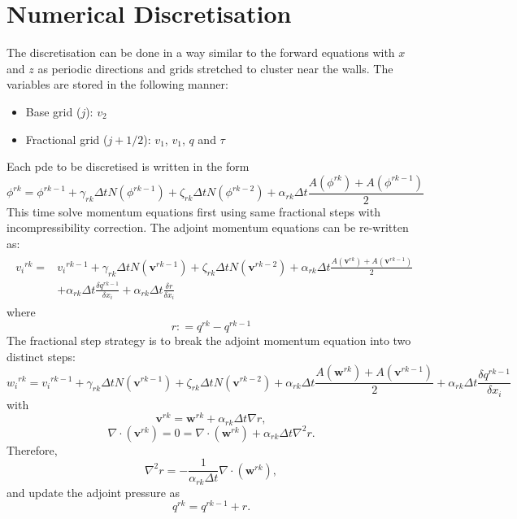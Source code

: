 \documentclass[preprint,12pt]{article}
\begin{document}
\section{Numerical Discretisation}
The discretisation can be done in a way similar to the forward equations with $x$ and $z$ as periodic directions and grids stretched to cluster near the walls. The variables are stored in the following manner:
\begin{itemize}
	\item Base grid ($j$): $v_2$
	\item Fractional grid ($j+1/2$): $v_1$, $v_1$, $q$ and $\tau$ 
\end{itemize}
Each pde to be discretised is written in the form
\begin{equation}
\phi^{rk}=\phi^{rk-1}+\gamma_{rk}\Delta t N(\phi^{rk-1})+\zeta_{rk}\Delta t N(\phi^{rk-2})+\alpha_{rk}\Delta t\frac{A(\phi^{rk})+A(\phi^{rk-1})}{2}
\end{equation}
This time solve momentum equations first using same fractional steps with incompressibility correction.
The adjoint momentum equations can be re-written as:
\begin{align}
\begin{split}
{v_i}^{rk}=&{v_i}^{rk-1}+\gamma_{rk}\Delta t N(\mathbf{v}^{rk-1})+\zeta_{rk}\Delta t N(\mathbf{v}^{rk-2})+\alpha_{rk}\Delta t\frac{A(\mathbf{v}^{rk})+A(\mathbf{v}^{rk-1})}{2}\\&+\alpha_{rk}\Delta t\frac{\delta q^{rk-1}}{\delta x_i}+\alpha_{rk}\Delta t\frac{\delta r}{\delta x_i}
\end{split}
\end{align} 
where 
\begin{equation}
r\mathrel{\mathop:}= q^{rk}-q^{rk-1}
\end{equation}
The fractional step strategy is to break the adjoint momentum equation into two distinct steps:
\begin{equation}
{w_i}^{rk}={v_i}^{rk-1}+\gamma_{rk}\Delta t N(\mathbf{v}^{rk-1})+\zeta_{rk}\Delta t N(\mathbf{v}^{rk-2})+\alpha_{rk}\Delta t\frac{A(\mathbf{w}^{rk})+A(\mathbf{v}^{rk-1})}{2}+\alpha_{rk}\Delta t\frac{\delta q^{rk-1}}{\delta x_i}
\end{equation} 
with 
\begin{equation}
\mathbf{v}^{rk}=\mathbf{w}^{rk}+\alpha_{rk}\Delta t \nabla r,
\end{equation}
\begin{equation}
\nabla\cdot(\mathbf{v}^{rk})=0=\nabla\cdot(\mathbf{w}^{rk})+\alpha_{rk}\Delta t \nabla ^2 r.
\end{equation}
Therefore,
\begin{equation}
\nabla ^2 r=-\frac{1}{\alpha_{rk}\Delta t}\nabla\cdot(\mathbf{w}^{rk}),
\end{equation}
and update the adjoint pressure as
\begin{equation}
q^{rk}=q^{rk-1}+r.
\end{equation}
\end{document}
